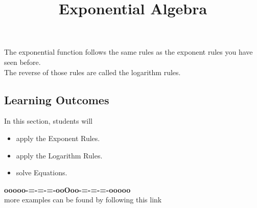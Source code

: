 \documentclass{ximera}
\title{Exponential Algebra}
\begin{document}
\begin{abstract}
\end{abstract}
\maketitle



The exponential function follows the same rules as the exponent rules you have seen before. \\


The reverse of those rules are called the logarithm rules.











\subsection*{Learning Outcomes}


\begin{sectionOutcomes}
In this section, students will 

\begin{itemize}
\item apply the Exponent Rules.
\item apply the Logarithm Rules.
\item solve Equations.
\end{itemize}
\end{sectionOutcomes}













\begin{center}
\textbf{\textcolor{green!50!black}{ooooo-=-=-=-ooOoo-=-=-=-ooooo}} \\

more examples can be found by following this link\\ 

\end{center}
\end{document}

